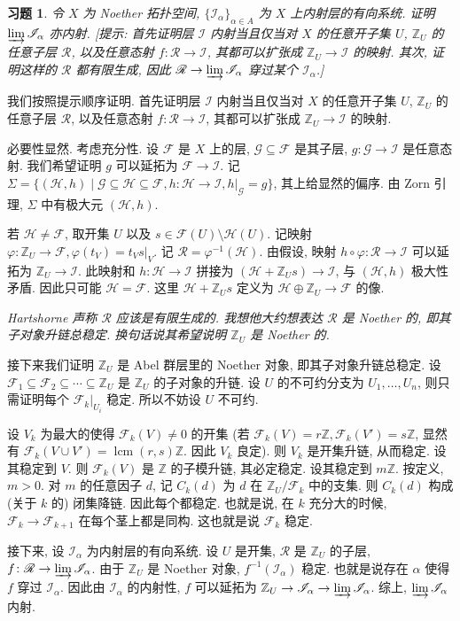 \documentclass{article}
\theoremstyle{exercise}
\newtheorem{exercise}{习题}[section]
\theoremstyle{plain}
\theoremstyle{remark}
\newenvironment{proofc}{\proof}{\endproof}
\def\Z{\mathbb{Z}}
\def\sF{\mathscr{F}}
\def\sG{\mathscr{G}}
\def\sH{\mathscr{H}}
\def\sI{\mathscr{I}}
\def\sR{\mathscr{R}}
\begin{document}
\begin{exercise}
  令 $X$ 为 Noether 拓扑空间, $\{\sI_\alpha\}_{\alpha \in A}$ 为 $X$ 上内射层的有向系统. 证明 $\varinjlim \sI_\alpha$ 亦内射.
  [\emph{提示:} 首先证明层 $\sI$ 内射当且仅当对 $X$ 的任意开子集 $U$, $\Z_U$ 的任意子层 $\sR$, 以及任意态射 $f \colon \sR \to \sI$,
  其都可以扩张成 $\Z_U \to \sI$ 的映射.
  其次, 证明这样的 $\sR$ 都有限生成, 因此 $\sR \to \varinjlim \sI_\alpha$ 穿过某个 $\sI_\alpha$.]
\end{exercise}

\begin{proofc}
  我们按照提示顺序证明. 首先证明层 $\sI$ 内射当且仅当对 $X$ 的任意开子集 $U$, $\Z_U$ 的任意子层 $\sR$, 以及任意态射 $f \colon \sR \to \sI$,
  其都可以扩张成 $\Z_U \to \sI$ 的映射.

  必要性显然. 考虑充分性. 设 $\sF$ 是 $X$ 上的层, $\sG \subseteq \sF$ 是其子层, $g \colon \sG \to \sI$ 是任意态射.
  我们希望证明 $g$ 可以延拓为 $\sF \to \sI$.
  记 $\Sigma = \{ (\sH, h) \mid \sG \subseteq \sH \subseteq \sF, h \colon \sH \to \sI, h|_{\sG} = g \}$,
  其上给显然的偏序. 由 Zorn 引理, $\Sigma$ 中有极大元 $(\sH, h)$.

  若 $\sH \neq \sF$, 取开集 $U$ 以及 $s \in \sF(U) \setminus \sH(U)$.
  记映射 $\varphi \colon \Z_U \to \sF, \varphi(t_V) = t_Vs|_V$. 记 $\sR = \varphi^{-1}(\sH)$.
  由假设, 映射 $h \circ \varphi \colon \sR \to \sI$ 可以延拓为 $\Z_U \to \sI$.
  此映射和 $h \colon \sH \to \sI$ 拼接为 $(\sH + \Z_Us) \to \sI$, 与 $(\sH, h)$ 极大性矛盾. 因此只可能 $\sH = \sF$.
  这里 $\sH + \Z_Us$ 定义为 $\sH \oplus \Z_U \to \sF$ 的像.

  \emph{Hartshorne 声称 $\sR$ 应该是有限生成的. 我想他大约想表达 $\sR$ 是 Noether 的, 即其子对象升链总稳定. 换句话说其希望说明 $\Z_U$ 是 Noether 的.}

  接下来我们证明 $\Z_U$ 是 Abel 群层里的 Noether 对象, 即其子对象升链总稳定.
  设 $\sF_1 \subseteq \sF_2 \subseteq \cdots \subseteq \Z_U$ 是 $\Z_U$ 的子对象的升链.
  设 $U$ 的不可约分支为 $U_1, \dots, U_n$, 则只需证明每个 $\sF_k|_{U_i}$ 稳定. 所以不妨设 $U$ 不可约.

  设 $V_k$ 为最大的使得 $\sF_k(V) \neq 0$ 的开集 (若 $\sF_k(V) = r\Z, \sF_k(V') = s\Z$, 显然有 $\sF_k(V \cup V') = \operatorname{lcm}(r, s)\Z$. 因此 $V_k$ 良定).
  则 $V_k$ 是开集升链, 从而稳定. 设其稳定到 $V$.
  则 $\sF_k(V)$ 是 $\Z$ 的子模升链, 其必定稳定.
  设其稳定到 $m\Z$. 按定义, $m > 0$.
  对 $m$ 的任意因子 $d$, 记 $C_k(d)$ 为 $d$ 在 $\Z_U / \sF_k$ 中的支集. 则 $C_k(d)$ 构成 (关于 $k$ 的) 闭集降链.
  因此每个都稳定. 也就是说, 在 $k$ 充分大的时候, $\sF_k \to \sF_{k+1}$ 在每个茎上都是同构. 这也就是说 $\sF_k$ 稳定.

  接下来, 设 $\sI_\alpha$ 为内射层的有向系统. 设 $U$ 是开集, $\sR$ 是 $\Z_U$ 的子层, $f \colon \sR \to \varinjlim \sI_\alpha$.
  由于 $\Z_U$ 是 Noether 对象, $f^{-1}(\sI_\alpha)$ 稳定. 也就是说存在 $\alpha$ 使得 $f$ 穿过 $\sI_\alpha$.
  因此由 $\sI_\alpha$ 的内射性, $f$ 可以延拓为 $\Z_U \to \sI_\alpha \to \varinjlim \sI_\alpha$. 综上, $\varinjlim \sI_\alpha$ 内射.
\end{proofc}
\end{document}
